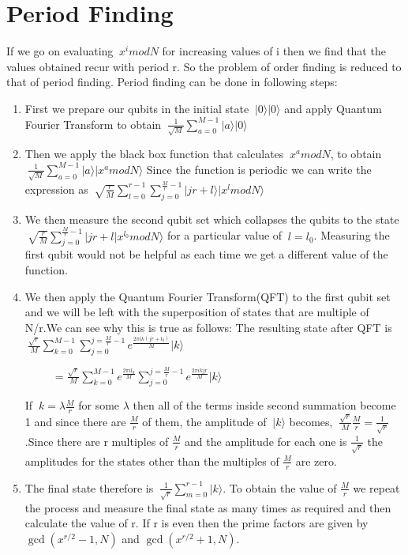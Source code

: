 \documentclass[a4,12pt]{article}
\begin{document}
\section*{Period Finding}
If we go on evaluating $\ x^{i}modN$ for increasing values of i then we find that the values obtained recur with period r. So the problem of order finding is reduced to that of period finding. Period finding can be done in following steps:
\begin{enumerate}
	\item First we prepare our qubits in the initial state $\ |0\rangle |0\rangle$ and apply Quantum Fourier Transform to obtain $\ \frac{1}{\sqrt{M}} \sum_{a=0}^{M-1}|a\rangle|0\rangle$ 
 \item Then we apply the black box function that calculates $\ x^amod N$, to obtain
 $\ \frac{1}{\sqrt{M}} \sum_{a=0}^{M-1}|a\rangle|x^a modN\rangle$ 
 Since the function is periodic we can write the expression as 
 $\ \sqrt{\frac{r}{M}}\sum_{l=0}^{r-1}\sum_{j=0}^{\frac{M}{r}-1}|{jr+l}\rangle|x^l mod N\rangle$ 
\item We then measure the second qubit set which collapses the qubits to the state $\
\sqrt{\frac{r}{M}} \sum_{j=0}^{\frac{M}{r}-1}|{jr+l}|{x^{l_0} mod N\rangle}$ 
for a particular value of $\ l=l_0$. Measuring the first qubit would not be helpful as each time we get a different value of the function.
\item We then apply the Quantum Fourier Transform(QFT) to the first qubit set and we will be left with the superposition of states that are multiple of N/r.We can see why this is true as follows: The resulting state after QFT is 
$\ 
\frac{\sqrt{r}}{M}\sum_{k=0}^{M-1}\sum_{j=0}^{j=\frac{M}{r}-1} e^{\frac{2\pi ik(jr+l_0)}{M}}|k\rangle$

 $\ \qquad\ =\frac{\sqrt{r}}{M}\sum_{k=0}^{M-1}e^{\frac{2\pi i l_0}{M}}\sum_{j=0}^{j=\frac{M}{r}-1} e^{\frac{2\pi ikjr}{M}}|k\rangle$

If $\ k=\lambda\frac{M}{r}$ for some $\lambda$ then all of the terms inside second summation become 1 and since there are $\frac{M}{r}$ of them, the  amplitude of $\ |k\rangle$ becomes,
$\ \frac{\sqrt{r}}{M}\frac{M}{r} = \frac{1}{\sqrt{r}}$ .Since there are r multiples of $\frac{M}{r}$ and the amplitude for each one is $\frac{1}{\sqrt{r}}$ the amplitudes for the states other than the multiples of $\frac{M}{r}$ are zero.  
\item
The final state therefore is 
$\ \frac{1}{\sqrt{r}}\sum_{m=0}^{r-1}|k\rangle$. To obtain the value of $\frac{M}{r}$ we repeat the process and measure the final state as many times as required and then calculate the value of r. If r is even then the prime factors are given by $\gcd({x^{r/2}-1},N)$ and $\gcd({x^{r/2}+1},N)$.

\end{enumerate}	
\end{document}
